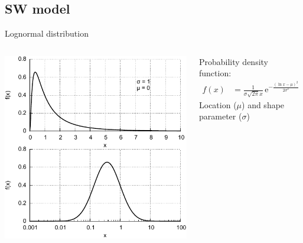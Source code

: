 \subsection{SW model}

\begin{frame}[c,label=lognormal_distribution]{Lognormal distribution}{}
	\begin{columns}[c]
		
	\includegraphics[width=\textwidth]{../figures_of_mine/gnuplots/lognormal_semi_log.pdf}

	
	Probability density function:
	\begin{align}
		f(x) &= \frac{1}{\sigma \sqrt{2 \pi} x} \, \text{e}^{- \frac{(\ln x - \mu)^2}{2 \sigma^2}}	\nonumber
	\end{align}
	Location ($\mu$) and shape parameter ($\sigma$)
	
	\end{columns}
\end{frame}

% 





